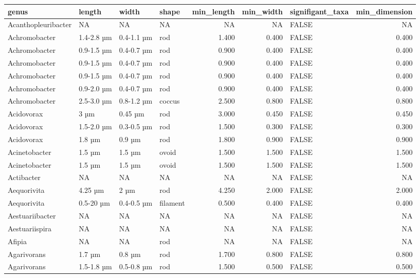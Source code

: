 \documentclass[
]{article}
\begin{document}
\begin{table}
\centering
\begin{tabular}{l|l|l|l|r|r|l|r}
\hline
genus & length & width & shape & min\_length & min\_width & signifigant\_taxa & min\_dimension\\
\hline
Acanthopleuribacter & NA & NA & NA & NA & NA & FALSE & NA\\
\hline
Achromobacter & 1.4-2.8 µm & 0.4-1.1 µm & rod & 1.400 & 0.400 & FALSE & 0.400\\
\hline
Achromobacter & 0.9-1.5 µm & 0.4-0.7 µm & rod & 0.900 & 0.400 & FALSE & 0.400\\
\hline
Achromobacter & 0.9-1.5 µm & 0.4-0.7 µm & rod & 0.900 & 0.400 & FALSE & 0.400\\
\hline
Achromobacter & 0.9-1.5 µm & 0.4-0.7 µm & rod & 0.900 & 0.400 & FALSE & 0.400\\
\hline
Achromobacter & 0.9-2.0 µm & 0.4-0.7 µm & rod & 0.900 & 0.400 & FALSE & 0.400\\
\hline
Achromobacter & 2.5-3.0 µm & 0.8-1.2 µm & coccus & 2.500 & 0.800 & FALSE & 0.800\\
\hline
Acidovorax & 3 µm & 0.45 µm & rod & 3.000 & 0.450 & FALSE & 0.450\\
\hline
Acidovorax & 1.5-2.0 µm & 0.3-0.5 µm & rod & 1.500 & 0.300 & FALSE & 0.300\\
\hline
Acidovorax & 1.8 µm & 0.9 µm & rod & 1.800 & 0.900 & FALSE & 0.900\\
\hline
Acinetobacter & 1.5 µm & 1.5 µm & ovoid & 1.500 & 1.500 & FALSE & 1.500\\
\hline
Acinetobacter & 1.5 µm & 1.5 µm & ovoid & 1.500 & 1.500 & FALSE & 1.500\\
\hline
Actibacter & NA & NA & NA & NA & NA & FALSE & NA\\
\hline
Aequorivita & 4.25 µm & 2 µm & rod & 4.250 & 2.000 & FALSE & 2.000\\
\hline
Aequorivita & 0.5-20 µm & 0.4-0.5 µm & filament & 0.500 & 0.400 & FALSE & 0.400\\
\hline
Aestuariibacter & NA & NA & NA & NA & NA & FALSE & NA\\
\hline
Aestuariispira & NA & NA & NA & NA & NA & FALSE & NA\\
\hline
Afipia & NA & NA & rod & NA & NA & FALSE & NA\\
\hline
Agarivorans & 1.7 µm & 0.8 µm & rod & 1.700 & 0.800 & FALSE & 0.800\\
\hline
Agarivorans & 1.5-1.8 µm & 0.5-0.8 µm & rod & 1.500 & 0.500 & FALSE & 0.500\\

\end{tabular}
\end{table}
\end{document}
